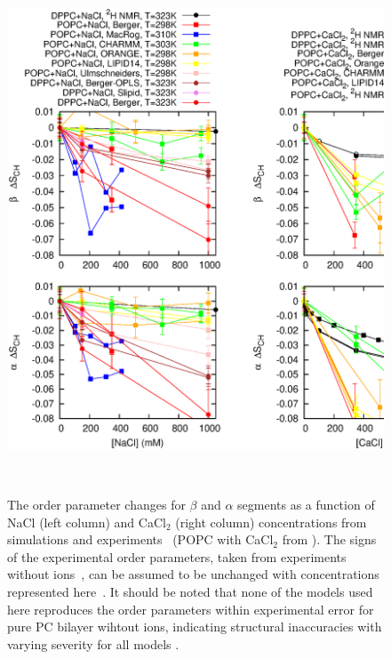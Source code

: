 \documentclass[pre,aps,floatfix,authordate1-4,twocolumn]{revtex4-1}
\begin{document}
\begin{figure}[]
  \centering
  \includegraphics[width=15cm]{../Fig/OrderParameterIONSchanges.eps}
  \caption{\label{ordPions}
    The order parameter changes for $\beta$ and $\alpha$ segments as a function of NaCl (left column) 
    and CaCl$_2$ (right column) concentrations from simulations and experiments~\cite{akutsu81} 
    (POPC with CaCl$_2$ from \cite{altenbach84}). The signs of the experimental order parameters, taken from
    experiments without ions~\cite{hong95a,hong95b,gross97}, can be assumed to be unchanged 
    with concentrations represented here~\cite{altenbach84,ollila15}. It should be noted that
    none of the models used here reproduces the order parameters within experimental error
    for pure PC bilayer wihtout ions, indicating structural inaccuracies with varying severity
    for all models \cite{botan15}.
   }
 \\
\end{figure}
\end{document}
